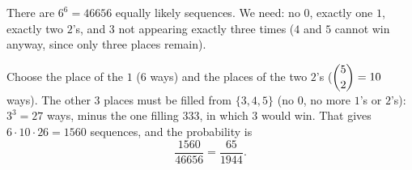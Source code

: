 There are $6^6=46656$ equally likely sequences. We need: no $0$, exactly one $1$, exactly two $2$'s, and $3$ not appearing exactly three times ($4$ and $5$ cannot win anyway, since only three places remain).

Choose the place of the $1$ ($6$ ways) and the places of the two $2$'s ($\dbinom52=10$ ways). The other $3$ places must be filled from $\{3,4,5\}$ (no $0$, no more $1$'s or $2$'s): $3^3=27$ ways, minus the one filling $333$, in which $3$ would win. That gives $6\cdot10\cdot26=1560$ sequences, and the probability is
\[\dfrac{1560}{46656}=\boxed{\dfrac{65}{1944}} .\]
